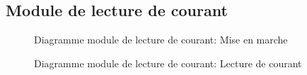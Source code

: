 	\subsection{Module de lecture de courant}

		\begin{figure}[H]
			\centering
			\caption{Diagramme module de lecture de courant: Mise en marche}
			\label{fig:diagrammefonctionnelcurrentmiseenmarche}
		\end{figure}

		\begin{figure}[H]
			\centering
			\caption{Diagramme module de lecture de courant: Lecture de courant}
			\label{fig:diagrammefonctionnelcurrentlecture-de-courant}
		\end{figure}


